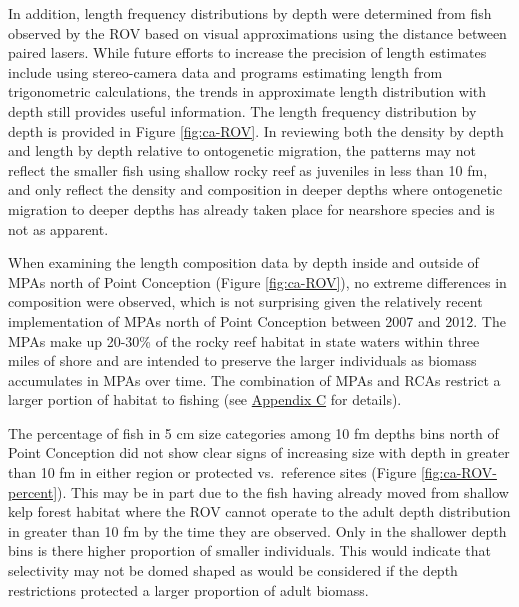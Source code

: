 \documentclass[11pt,
  english,
  letterpaper,
]{article}
\begin{document}
\leavevmode\tagmcend\tagstructend\par


In addition, length frequency distributions by depth were determined from fish observed by the ROV based on visual approximations using the distance between paired lasers. While future efforts to increase the precision of length estimates include using stereo-camera data and programs estimating length from trigonometric calculations, the trends in approximate length distribution with depth still provides useful information. The length frequency distribution by depth is provided in Figure \ref{fig:ca-ROV}. In reviewing both the density by depth and length by depth relative to ontogenetic migration, the patterns may not reflect the smaller fish using shallow rocky reef as juveniles in less than 10 fm, and only reflect the density and composition in deeper depths where ontogenetic migration to deeper depths has already taken place for nearshore species and is not as apparent.

\leavevmode\tagmcend\tagstructend\par


When examining the length composition data by depth inside and outside of MPAs north of Point Conception (Figure \ref{fig:ca-ROV}), no extreme differences in composition were observed, which is not surprising given the relatively recent implementation of MPAs north of Point Conception between 2007 and 2012. The MPAs make up 20-30\% of the rocky reef habitat in state waters within three miles of shore and are intended to preserve the larger individuals as biomass accumulates in MPAs over time. The combination of MPAs and RCAs restrict a larger portion of habitat to fishing (see {\protect\hyperlink{append_c}{Appendix C}\leavevmode\tagmcend\tagstructend} for details).

\leavevmode\tagmcend\tagstructend\par


The percentage of fish in 5 cm size categories among 10 fm depths bins north of Point Conception did not show clear signs of increasing size with depth in greater than 10 fm in either region or protected vs.~reference sites (Figure \ref{fig:ca-ROV-percent}). This may be in part due to the fish having already moved from shallow kelp forest habitat where the ROV cannot operate to the adult depth distribution in greater than 10 fm by the time they are observed. Only in the shallower depth bins is there higher proportion of smaller individuals. This would indicate that selectivity may not be domed shaped as would be considered if the depth restrictions protected a larger proportion of adult biomass.
\end{document}
